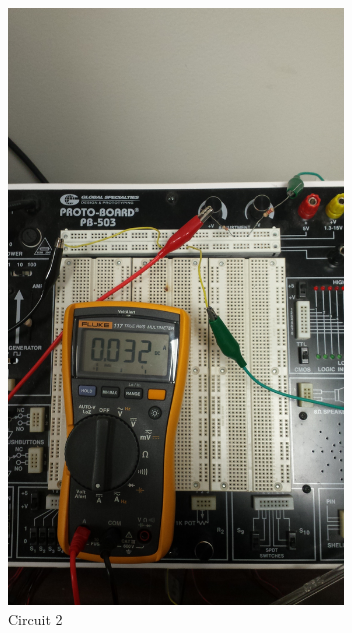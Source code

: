 \documentclass[12pt]{article}
\begin{document}
\begin{figure}[h!] %
   \centering
   \includegraphics[width=3.5in,angle=-90]{Circuit_2_real.jpg} 
   \caption{Circuit 2}
   \label{fig:example}
\end{figure}
\end{document}
